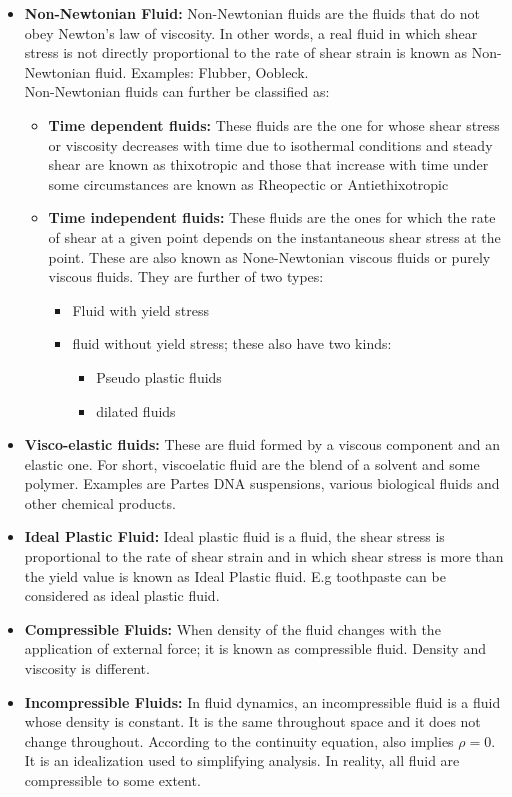 \documentclass[11pt]{report}
\newcommand{\bt}[1]{\textbf{#1}}
\begin{document}
\begin{itemize}[label=--]
		\item\bt{Non-Newtonian Fluid:} Non-Newtonian fluids are the fluids that do not obey Newton's law of viscosity. In other words, a real fluid in which shear stress is not directly proportional to the rate of shear strain is known as Non-Newtonian fluid. Examples: Flubber, Oobleck.\\
		Non-Newtonian fluids can further be classified as:
		\begin{itemize}
			\item \bt{Time dependent fluids:} These fluids are the one for whose shear stress or viscosity decreases with time due to isothermal conditions and steady shear are known as thixotropic and those that increase with time under some circumstances are known as Rheopectic or Antiethixotropic
			
			\item \bt{Time independent fluids:} These fluids are the ones for which the rate of shear at a given point depends on the instantaneous shear stress at the point. These are also known as None-Newtonian viscous fluids or purely viscous fluids. They are further of two types:
			\begin{itemize}
				\item Fluid with yield stress
				\item fluid without yield stress; these also have two kinds:
				\begin{itemize}
					\item Pseudo plastic fluids
					\item dilated fluids
				\end{itemize}
			\end{itemize}
		\end{itemize}
	
		\item \bt{Visco-elastic fluids:} These are fluid formed by a viscous component and an elastic one. For short, viscoelatic fluid are the blend of a solvent and some polymer. Examples are Partes DNA suspensions, various biological fluids and other chemical products.
		
		\item\bt{Ideal Plastic Fluid:} Ideal plastic fluid is a fluid, the shear stress is proportional to the rate of shear strain and in which shear stress is more than the yield value is known as Ideal Plastic fluid. E.g toothpaste can be considered as ideal plastic fluid.
		
		\item\bt{Compressible Fluids:} When density of the fluid changes with the application of external force; it is known as compressible fluid. Density and viscosity is different.
		
		\item\bt{Incompressible Fluids:} In fluid dynamics, an incompressible fluid is a fluid whose density is constant. It is the same throughout space and it does not change throughout. According to the continuity equation, also implies $\rho=0$. It is an idealization used to simplifying analysis. In reality, all fluid are compressible to some extent.
	\end{itemize}
\end{document}
